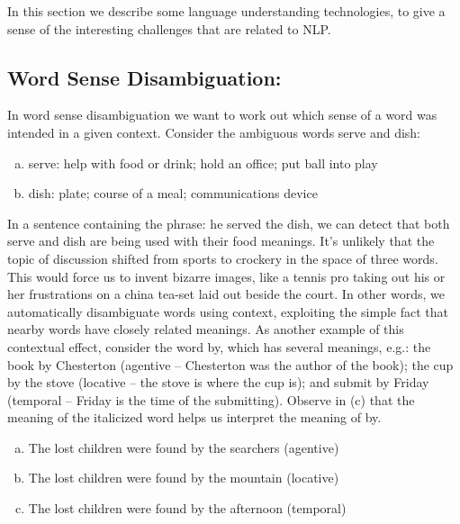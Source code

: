 In this section we describe some language understanding technologies, to give a sense of the interesting challenges that are related to NLP.
\subsection{Word Sense Disambiguation:}
In word sense disambiguation we want to work out which sense of a word was intended in a given context. Consider the ambiguous words serve and dish:

\begin{enumerate}[a.]
    \item serve: help with food or drink; hold an office; put ball into play
    \item dish: plate; course of a meal; communications device    
\end{enumerate}

In a sentence containing the phrase: he served the dish, we can detect that both serve and dish are being used with their food meanings. It's unlikely that the topic of discussion shifted from sports to crockery in the space of three words. This would force us to invent bizarre images, like a tennis pro taking out his or her frustrations on a china tea-set laid out beside the court. In other words, we automatically disambiguate words using context, exploiting the simple fact that nearby words have closely related meanings. As another example of this contextual effect, consider the word by, which has several meanings, e.g.: the book by Chesterton (agentive -- Chesterton was the author of the book); the cup by the stove (locative -- the stove is where the cup is); and submit by Friday (temporal -- Friday is the time of the submitting). Observe in (c) that the meaning of the italicized word helps us interpret the meaning of by.
\begin{enumerate}[a.]
    \item The lost children were found by the searchers (agentive)
    \item The lost children were found by the mountain (locative)
    \item The lost children were found by the afternoon (temporal)    
\end{enumerate}
